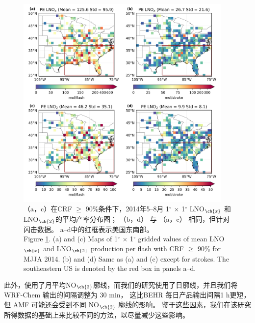 \begin{figure}[H]
\centering
\includegraphics[width=0.95\textwidth]{./figures/us_pe_sum.png}
\caption{（a，c）在CRF $\geq$ 90\%条件下，2014年5--8月 1$^{\circ}$ $\times$ 1$^{\circ}$ LNO$_{\ch{x}}$ 和LNO$_{\ch{2}}$的平均产率分布图；
     （b，d） 与 （a，c） 相同，但针对闪击数据。
     a--d中的红框表示美国东南部。\\
     Figure \ref{fig:us_pe_sum}. (a) and (c) Maps of 1$^{\circ}$ $\times$ 1$^{\circ}$ gridded values of mean LNO$_{\ch{x}}$
    and LNO$_{\ch{2}}$ production per flash with CRF $\geq$ 90\% for MJJA 2014.
    (b) and (d) Same as (a) and (c) except for strokes.
    The southeastern US is denoted by the red box in panels a--d.
}
\label{fig:us_pe_sum}
\end{figure}


此外，\citet{Lapierre.2020}使用了月平均NO$_{\ch{2}}$廓线，而我们的研究使用了日廓线，并且我们将WRF-Chem 输出的间隔调整为 30 min，
这比BEHR 每日产品输出间隔1 h更短，但 AMF 可能还会受到不同 NO$_{\ch{2}}$ 廓线的影响。
鉴于这些因素，我们在该研究所得数据的基础上来比较不同的方法，以尽量减少这些影响。

